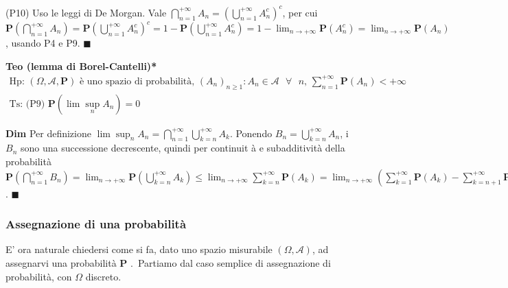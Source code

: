\documentclass{article}
\begin{document}
(P10) Uso le leggi di De Morgan. Vale $\bigcap_{n=1}^{+\infty }A_{n}=\left(
\bigcup_{n=1}^{+\infty }A_{n}^{c}\right) ^{c}$, per cui $\mathbf{P}\left(
\bigcap_{n=1}^{+\infty }A_{n}\right) =\mathbf{P}\left(
\bigcup_{n=1}^{+\infty }A_{n}^{c}\right) ^{c}=1-\mathbf{P}\left(
\bigcup_{n=1}^{+\infty }A_{n}^{c}\right) =1-\lim_{n\rightarrow +\infty }%
\mathbf{P}\left( A_{n}^{c}\right) =\lim_{n\rightarrow +\infty }\mathbf{P}%
\left( A_{n}\right) $, usando P4 e P9. $\blacksquare $

\textbf{Teo (lemma di Borel-Cantelli)*}%
\begin{gather*}
\text{Hp}\text{: }\left( \Omega ,\mathcal{A},\mathbf{P}\right) \text{ \`{e}
uno spazio di probabilit\`{a}, }\left( A_{n}\right) _{n\geq 1}:A_{n}\in 
\mathcal{A}\text{ }\forall \text{ }n\text{, }\sum_{n=1}^{+\infty }\mathbf{P}%
\left( A_{n}\right) <+\infty \\
\text{Ts}\text{: (P9) }\mathbf{P}\left( \lim \sup_{n}A_{n}\right) =0
\end{gather*}

\textbf{Dim} Per definizione $\lim \sup_{n}A_{n}=\bigcap_{n=1}^{+\infty
}\bigcup_{k=n}^{+\infty }A_{k}$. Ponendo $B_{n}=\bigcup_{k=n}^{+\infty
}A_{n} $, i $B_{n}$ sono una successione decrescente, quindi per continuit%
\`{a} e subadditivit\`{a} della probabilit\`{a} $\mathbf{P}\left(
\bigcap_{n=1}^{+\infty }B_{n}\right) =\lim_{n\rightarrow +\infty }\mathbf{P}%
\left( \bigcup_{k=n}^{+\infty }A_{k}\right) \leq \lim_{n\rightarrow +\infty
}\sum_{k=n}^{+\infty }\mathbf{P}\left( A_{k}\right) =\lim_{n\rightarrow
+\infty }\left( \sum_{k=1}^{+\infty }\mathbf{P}\left( A_{k}\right)
-\sum_{k=n+1}^{+\infty }\mathbf{P}\left( A_{k}\right) \right)
=\lim_{n\rightarrow +\infty }0=0$. $\blacksquare $

\subsubsection{Assegnazione di una probabilit\`{a}}

E' ora naturale chiedersi come si fa, dato uno spazio misurabile $\left(
\Omega ,\mathcal{A}\right) $, ad assegnarvi una probabilit\`{a} $\mathbf{P}$%
.\ Partiamo dal caso semplice di assegnazione di probabilit\`{a}, con $%
\Omega $ discreto.
\end{document}
